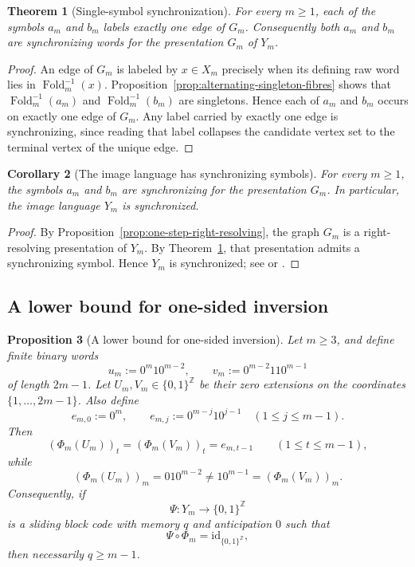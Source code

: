 \documentclass[11pt,letterpaper]{article}
\numberwithin{equation}{section}
\theoremstyle{plain}
\newtheorem{theorem}{Theorem}[section]
\newtheorem{proposition}[theorem]{Proposition}
\newtheorem{corollary}[theorem]{Corollary}
\theoremstyle{definition}
\theoremstyle{remark}
\newcommand{\ZZ}{\mathbb{Z}}
\DeclareMathOperator{\Fold}{Fold}
\begin{document}
\begin{theorem}[Single-symbol synchronization]
\label{thm:alternating-single-symbol-synchronizing}
For every $m\ge 1$, each of the symbols $a_m$ and $b_m$ labels exactly one edge
of $G_m$.  Consequently both $a_m$ and $b_m$ are synchronizing words for the
presentation $G_m$ of $Y_m$.
\end{theorem}

\begin{proof}
An edge of $G_m$ is labeled by $x\in X_m$ precisely when its defining raw word
lies in $\Fold_m^{-1}(x)$.  Proposition~\ref{prop:alternating-singleton-fibres}
shows that $\Fold_m^{-1}(a_m)$ and $\Fold_m^{-1}(b_m)$ are singletons.  Hence
each of $a_m$ and $b_m$ occurs on exactly one edge of $G_m$.  Any label carried
by exactly one edge is synchronizing, since reading that label collapses the
candidate vertex set to the terminal vertex of the unique edge.
\end{proof}

\begin{corollary}[The image language has synchronizing symbols]
\label{cor:Y-m-synchronized}
For every $m\ge 1$, the symbols $a_m$ and $b_m$ are synchronizing for the
presentation $G_m$.  In particular, the image language $Y_m$ is synchronized.
\end{corollary}

\begin{proof}
By Proposition~\ref{prop:one-step-right-resolving}, the graph $G_m$ is a
right-resolving presentation of $Y_m$.  By
Theorem~\ref{thm:alternating-single-symbol-synchronizing}, that presentation
admits a synchronizing symbol.  Hence $Y_m$ is synchronized; see
\cite[Ch.~3]{LindMarcus1995} or \cite[Ch.~4]{Kitchens1998SymbolicDynamics}.
\end{proof}

\subsection{A lower bound for one-sided inversion}

\begin{proposition}[A lower bound for one-sided inversion]
\label{prop:one-sided-inverse-memory-lower-bound}
Let $m\ge 3$, and define finite binary words
\[
u_m:=0^m10^{m-2},
\qquad
v_m:=0^{m-2}110^{m-1}
\]
of length $2m-1$.  Let $U_m,V_m\in\{0,1\}^{\ZZ}$ be their zero extensions on
the coordinates $\{1,\ldots,2m-1\}$.  Also define
\[
e_{m,0}:=0^m,
\qquad
e_{m,j}:=0^{m-j}10^{j-1}
\quad (1\le j\le m-1).
\]
Then
\[
(\Phi_m(U_m))_t=(\Phi_m(V_m))_t=e_{m,t-1}
\qquad (1\le t\le m-1),
\]
while
\[
(\Phi_m(U_m))_m=010^{m-2}\neq 10^{m-1}=(\Phi_m(V_m))_m.
\]
Consequently, if
\[
\Psi:Y_m\to\{0,1\}^{\ZZ}
\]
is a sliding block code with memory $q$ and anticipation $0$ such that
\[
\Psi\circ\Phi_m=\mathrm{id}_{\{0,1\}^{\ZZ}},
\]
then necessarily $q\ge m-1$.
\end{proposition}
\end{document}
